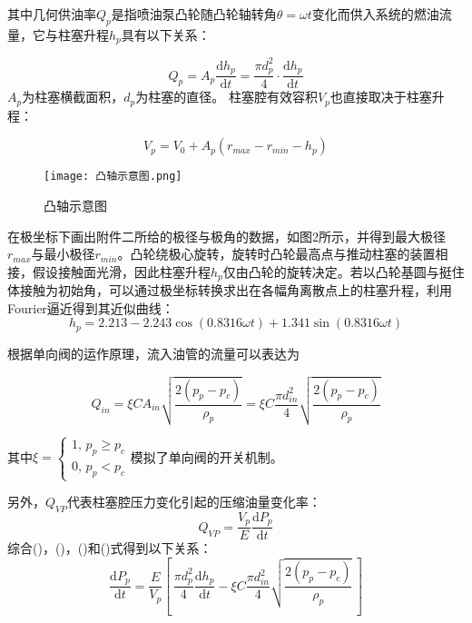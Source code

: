 \documentclass[withoutpreface,bwprint]{cumcmthesis} %
\begin{document}
			其中几何供油率$Q_p$是指喷油泵凸轮随凸轮轴转角$\theta = \omega t$变化而供入系统的燃油流量，它与柱塞升程$h_p$具有以下关系：
			
			\begin{equation}Q_p = A_p \frac{\mathrm{d}h_p}{\mathrm{d}t} = \frac{\pi d_p^2}{4} \cdot \frac{\mathrm{d}h_p}{\mathrm{d}t}\end{equation}
			$A_p$为柱塞横截面积，$d_p$为柱塞的直径。
			柱塞腔有效容积$V_p$也直接取决于柱塞升程：
			
			\begin{equation}V_p = V_0 + A_p (r_{max} - r_{min} - h_p)\end{equation}
			
			\begin{figure}[!htbp]
				\centering
				\texttt{[image: 凸轴示意图.png]}
				\caption{凸轴示意图}
			\end{figure}
		
			在极坐标下画出附件二所给的极径与极角的数据，如图2所示，并得到最大极径$r_{max}$与最小极径$r_{min}$。凸轮绕极心旋转，旋转时凸轮最高点与推动柱塞的装置相接，假设接触面光滑，因此柱塞升程$h_p$仅由凸轮的旋转决定。若以凸轮基圆与挺住体接触为初始角，可以通过极坐标转换求出在各幅角离散点上的柱塞升程，利用Fourier逼近得到其近似曲线：
			\begin{equation}h_p = 2.213 - 2.243 \cos(0.8316 \omega t) + 1.341 \sin(0.8316 \omega t)\end{equation}
			
			根据单向阀的运作原理，流入油管的流量可以表达为
			
			\begin{equation}Q_{in} = \xi CA_{in} \sqrt{\frac{2(p_p - p_c)}{\rho_p}} = \xi C \frac{\pi d_{in}^2}{4} \sqrt{\frac{2(p_p - p_c)}{\rho_p}}\end{equation}
			
			其中$\xi = \left\{ \begin{aligned}  1, \, p_p \geq p_c \\ 0, \, p_p < p_c \end{aligned} \right.$模拟了单向阀的开关机制。
			
			另外，$Q_{VP}$代表柱塞腔压力变化引起的压缩油量变化率：
			$$
			Q_{VP} = \frac{V_p}{E} \frac{\mathrm{d}P_p}{\mathrm{d}t}
			$$
			综合()，()，()和()式得到以下关系：
			$$
			\frac{\mathrm{d}P_p}{\mathrm{d}t} = \frac{E}{V_p} \left[ \, \frac{\pi d_p^2}{4}  \frac{\mathrm{d}h_p}{\mathrm{d}t} - \xi C \frac{\pi d_{in}^2}{4} \sqrt{\frac{2(p_p - p_c)}{\rho_p}} \, \right]
			$$
			
\end{document}
